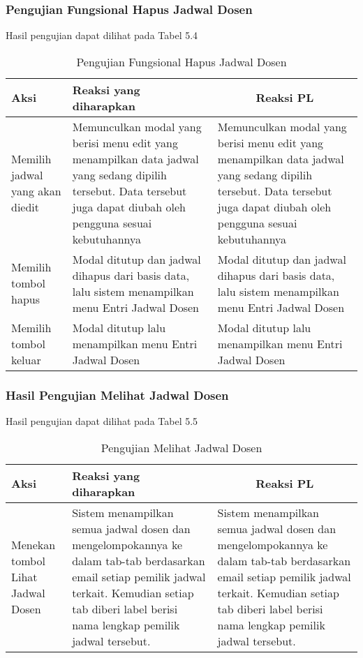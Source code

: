\subsubsection{Pengujian Fungsional Hapus Jadwal Dosen}
Hasil pengujian dapat dilihat pada Tabel 5.4
\begin{center}
	\begin{table}[H]
		\caption{Pengujian Fungsional Hapus Jadwal Dosen}
		\begin{tabular}{|p{5cm}|p{5cm}|p{5cm}|}
		\hline
		\centering Aksi	& 	\centering Reaksi yang diharapkan &  \multicolumn{1}{c|}{Reaksi PL} \\
		\hline
		Memilih jadwal yang akan diedit & Memunculkan modal yang berisi menu edit yang menampilkan data jadwal yang sedang dipilih tersebut. Data tersebut juga dapat diubah oleh pengguna sesuai kebutuhannya & Memunculkan modal yang berisi menu edit yang menampilkan data jadwal yang sedang dipilih tersebut. Data tersebut juga dapat diubah oleh pengguna sesuai kebutuhannya \\
		\hline
		Memilih tombol hapus & Modal ditutup dan jadwal dihapus dari basis data, lalu sistem menampilkan menu Entri Jadwal Dosen & Modal ditutup dan jadwal dihapus dari basis data, lalu sistem menampilkan menu Entri Jadwal Dosen \\
		\hline
		Memilih tombol keluar & Modal ditutup lalu menampilkan menu Entri Jadwal Dosen & Modal ditutup lalu menampilkan menu Entri Jadwal Dosen \\
		\hline
		\end{tabular}
	\end{table}
\end{center}

\subsubsection{Hasil Pengujian Melihat Jadwal Dosen}
Hasil pengujian dapat dilihat pada Tabel 5.5
\begin{center}
	\begin{table}[H]
		\caption{Pengujian Melihat Jadwal Dosen}
		\begin{tabular}{|p{5cm}|p{5cm}|p{5cm}|}
		\hline
		\centering Aksi	& 	\centering Reaksi yang diharapkan &  \multicolumn{1}{c|}{Reaksi PL} \\
		\hline
		Menekan tombol Lihat Jadwal Dosen & 
		Sistem menampilkan semua jadwal dosen dan mengelompokannya ke dalam tab-tab berdasarkan email setiap pemilik jadwal terkait. Kemudian setiap tab diberi label berisi nama lengkap pemilik jadwal tersebut. &
		Sistem menampilkan semua jadwal dosen dan mengelompokannya ke dalam tab-tab berdasarkan email setiap pemilik jadwal terkait. Kemudian setiap tab diberi label berisi nama lengkap pemilik jadwal tersebut.\\
		\hline
		\end{tabular}
	\end{table}
\end{center}

